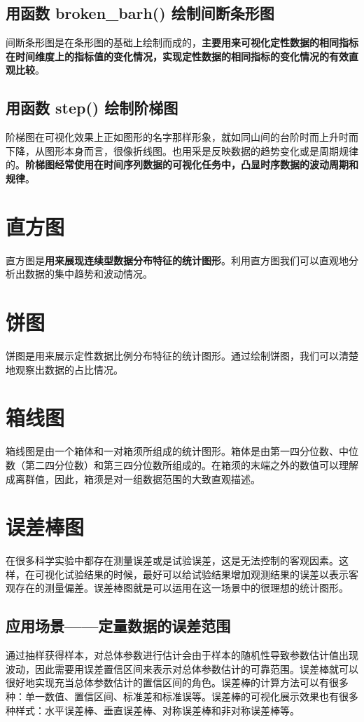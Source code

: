 \subsection{用函数 broken\_barh() 绘制间断条形图}
间断条形图是在条形图的基础上绘制而成的，\textbf{主要用来可视化定性数据的相同指标在时间维度上的指标值的变化情况，实现定性数据的相同指标的变化情况的有效直观比较}。
\subsection{用函数 step() 绘制阶梯图}
阶梯图在可视化效果上正如图形的名字那样形象，就如同山间的台阶时而上升时而下降，从图形本身而言，很像折线图。也用采是反映数据的趋势变化或是周期规律的。\textbf{阶梯图经常使用在时间序列数据的可视化任务中，凸显时序数据的波动周期和规律}。
\section{直方图}
直方图是\textbf{用来展现连续型数据分布特征的统计图形}。利用直方图我们可以直观地分析出数据的集中趋势和波动情况。
\section{饼图}
饼图是用来展示定性数据比例分布特征的统计图形。通过绘制饼图，我们可以清楚地观察出数据的占比情况。
\section{箱线图}
箱线图是由一个箱体和一对箱须所组成的统计图形。箱体是由第一四分位数、中位数（第二四分位数）和第三四分位数所组成的。在箱须的末端之外的数值可以理解成离群值，因此，箱须是对一组数据范围的大致直观描述。

\section{误差棒图}
在很多科学实验中都存在测量误差或是试验误差，这是无法控制的客观因素。这样，在可视化试验结果的时候，最好可以给试验结果增加观测结果的误差以表示客观存在的测量偏差。误差棒图就是可以运用在这一场景中的很理想的统计图形。

\subsection{应用场景——定量数据的误差范围}
通过抽样获得样本，对总体参数进行估计会由于样本的随机性导致参数估计值出现波动，因此需要用误差置信区间来表示对总体参数估计的可靠范围。误差棒就可以很好地实现充当总体参数估计的置信区间的角色。误差棒的计算方法可以有很多种：单一数值、置信区间、标准差和标准误等。误差棒的可视化展示效果也有很多种样式：水平误差棒、垂直误差棒、对称误差棒和非对称误差棒等。